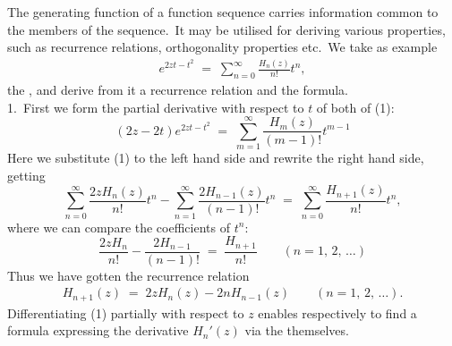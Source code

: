 \documentclass[12pt]{article}
\theoremstyle{definition}
\begin{document}
The generating function of a function sequence carries information common to the members of the sequence.\, It may be utilised for deriving various properties, such as recurrence relations, orthogonality properties etc.\, We take as example
\begin{align}
e^{2zt-t^2} \;=\; \sum_{n=0}^\infty\frac{H_n(z)}{n!}t^n,
\end{align}
the , and derive from it a recurrence relation and the  formula.\\

1.\, First we form the partial derivative with respect to $t$ of both  of (1):
$$(2z\!-\!2t)e^{2zt-t^2} \;=\; \sum_{m=1}^\infty\frac{H_m(z)}{(m\!-\!1)!}t^{m-1}$$
Here we substitute (1) to the left hand side and rewrite the right hand side, getting
$$\sum_{n=0}^\infty\frac{2zH_n(z)}{n!}t^n 
-\sum_{n=1}^\infty\frac{2H_{n-1}(z)}{(n\!-\!1)!}t^n
 \;=\; \sum_{n=0}^\infty\frac{H_{n+1}(z)}{n!}t^n,$$
where we can compare the coefficients of $t^n$:
$$\frac{2zH_n}{n!}-\frac{2H_{n-1}}{(n\!-\!1)!} \;=\; \frac{H_{n+1}}{n!} \qquad (n = 1,\,2,\,\ldots)$$
Thus we have gotten the recurrence relation
\begin{align}
H_{n+1}(z) \;=\; 2zH_n(z)-2nH_{n-1}(z) \qquad (n = 1,\,2,\,\ldots).
\end{align}
Differentiating (1) partially with respect to $z$ enables respectively to find a formula expressing the derivative 
$H_n'(z)$ via the  themselves.\\
\end{document}
